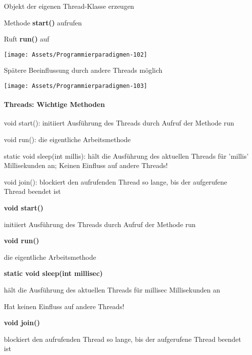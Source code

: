 \documentclass[10pt]{article}
\begin{document}
\begin{itemize*}
  \item Objekt der eigenen Thread-Klasse erzeugen
  \item Methode \textbf{start()} aufrufen
  \begin{itemize*}
    \item Ruft \textbf{run()} auf
  \end{itemize*}
  \begin{center}
    \centering
    \texttt{[image: Assets/Programmierparadigmen-102]}
  \end{center}
  \item Spätere Beeinflussung durch andere Threads möglich
  \begin{center}
    \centering
    \texttt{[image: Assets/Programmierparadigmen-103]}
  \end{center}
\end{itemize*}


\paragraph{Threads: Wichtige Methoden}
\begin{itemize*}
  \item void start(): initiiert Ausführung des Threads durch Aufruf der Methode run
  \item void run(): die eigentliche Arbeitsmethode
  \item static void sleep(int millis): hält die Ausführung des aktuellen Threads für 'millis' Millisekunden an; Keinen Einfluss auf andere Threads!
  \item void join(): blockiert den aufrufenden Thread so lange, bis der aufgerufene Thread beendet ist
\end{itemize*}

\begin{itemize*}
  \item \textbf{void start()}
  \begin{itemize*}
    \item initiiert Ausführung des Threads durch Aufruf der Methode run
  \end{itemize*}
  \item \textbf{void run()}
  \begin{itemize*}
    \item die eigentliche Arbeitsmethode
  \end{itemize*}
  \item \textbf{static void sleep(int millisec)}
  \begin{itemize*}
    \item hält die Ausführung des aktuellen Threads für millisec Millisekunden an
    \item Hat keinen Einfluss auf andere Threads!
  \end{itemize*}
  \item \textbf{void join()}
  \begin{itemize*}
    \item blockiert den aufrufenden Thread so lange, bis der aufgerufene Thread beendet ist
  \end{itemize*}
\end{itemize*}
\end{document}
